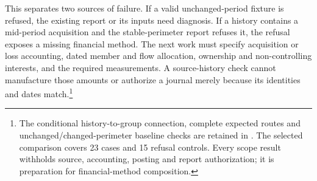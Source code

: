 This separates two sources of failure. If a valid unchanged-period fixture is refused, the existing report or its inputs need diagnosis. If a history contains a mid-period acquisition and the stable-perimeter report refuses it, the refusal exposes a missing financial method. The next work must specify acquisition or loss accounting, dated member and flow allocation, ownership and non-controlling interests, and the required measurements. A source-history check cannot manufacture those amounts or authorize a journal merely because its identities and dates match.\footnote{The conditional history-to-group connection, complete expected routes and unchanged/changed-perimeter baseline checks are retained in . The selected comparison covers 23 cases and 15 refusal controls. Every scope result withholds source, accounting, posting and report authorization; it is preparation for financial-method composition.}
